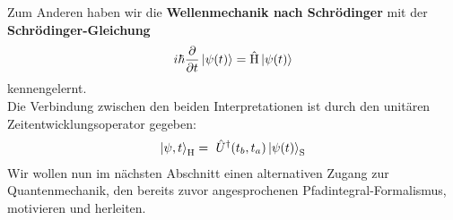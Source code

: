 Zum Anderen haben wir die \textbf{Wellenmechanik nach Schrödinger} mit der \textbf{Schrödinger-Gleichung}
\begin{align}
		i\hbar \frac{\partial}{\partial t} \ket{\psi(t)} = \hat{\text{H}} \ket{\psi(t)}
	\end{align}
kennengelernt. \\
Die Verbindung zwischen den beiden Interpretationen ist durch den unitären Zeitentwicklungsoperator gegeben:
\begin{align}
	\ket{\psi,t}_{\text{H}} = \ \hat{U}^{\dagger}(t_b,t_a)\ket{\psi(t)}_{\text{S}}
\end{align}
Wir wollen nun im nächsten Abschnitt einen alternativen Zugang zur Quantenmechanik, den bereits zuvor angesprochenen Pfadintegral-Formalismus, motivieren und herleiten.